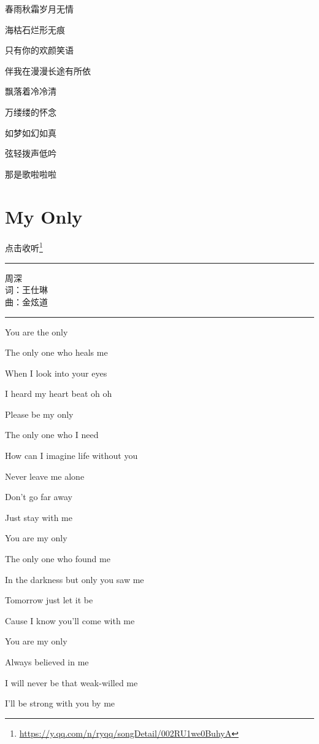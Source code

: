 \documentclass[]{ctexbook}
\renewcommand{\href}[2]{#2\footnote{\url{#1}}}
\begin{document}
春雨秋霜岁月无情

海枯石烂形无痕

只有你的欢颜笑语

伴我在漫漫长途有所依

飘落着冷冷清

万缕缕的怀念

如梦如幻如真

弦轻拨声低吟

那是歌啦啦啦

\section*{My Only}\label{my-only}


\href{https://y.qq.com/n/ryqq/songDetail/002RU1we0BuhyA}{点击收听}

\begin{center}\rule{0.5\linewidth}{0.5pt}\end{center}

周深\\
词：王仕琳\\
曲：金炫道

\begin{center}\rule{0.5\linewidth}{0.5pt}\end{center}

You are the only

The only one who heals me

When I look into your eyes

I heard my heart beat oh oh

Please be my only

The only one who I need

How can I imagine life without you

Never leave me alone

Don't go far away

Just stay with me

You are my only

The only one who found me

In the darkness but only you saw me

Tomorrow just let it be

Cause I know you'll come with me

You are my only

Always believed in me

I will never be that weak-willed me

I'll be strong with you by me
\end{document}
